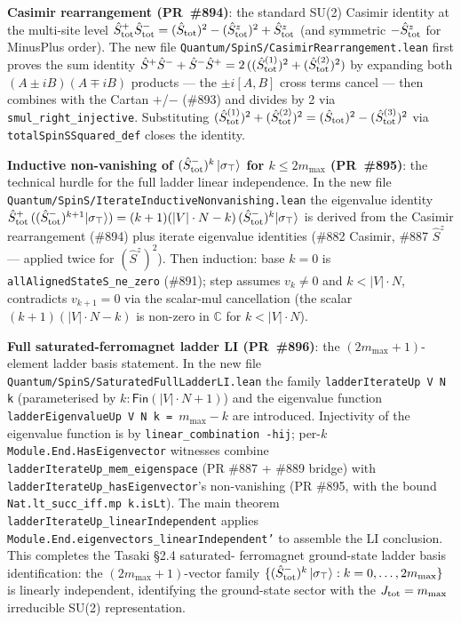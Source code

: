 \documentclass[a4paper,11pt]{article}
\begin{document}
\textbf{Casimir rearrangement (PR~\#894)}: the standard SU(2)
Casimir identity at the multi-site level
$\hat S^+_{\rm tot} \hat S^-_{\rm tot} =
 (\hat S_{\rm tot})^2 - (\hat S^z_{\rm tot})^2 + \hat S^z_{\rm tot}$
(and symmetric $-\hat S^z_{\rm tot}$ for MinusPlus order). The new
file \texttt{Quantum/SpinS/CasimirRearrangement.lean} first proves
the sum identity
$\hat S^+ \hat S^- + \hat S^- \hat S^+ = 2\,((\hat S^{(1)}_{\rm tot})
^2 + (\hat S^{(2)}_{\rm tot})^2)$ by expanding both
$(A \pm iB)(A \mp iB)$ products — the $\pm i [A, B]$ cross terms
cancel — then combines with the Cartan \(+\)/\(-\) (\#893) and divides by
2 via \texttt{smul\_right\_injective}. Substituting
$(\hat S^{(1)}_{\rm tot})^2 + (\hat S^{(2)}_{\rm tot})^2 =
 (\hat S_{\rm tot})^2 - (\hat S^{(3)}_{\rm tot})^2$
via \texttt{totalSpinSSquared\_def} closes the identity.

\textbf{Inductive non-vanishing of $(\hat S^-_{\rm tot})^k\,|\sigma_\top\rangle$
for $k\leq 2m_{\max}$ (PR~\#895)}: the technical hurdle for the
full ladder linear independence. In the new file
\texttt{Quantum/SpinS/IterateInductiveNonvanishing.lean} the
eigenvalue identity
$\hat S^+_{\rm tot}\,((\hat S^-_{\rm tot})^{k+1}|\sigma_\top\rangle)
 = (k+1)(|V|\cdot N - k)\,(\hat S^-_{\rm tot})^k|\sigma_\top\rangle$
is derived from the Casimir rearrangement (\#894) plus iterate
eigenvalue identities (\#882 Casimir, \#887 $\hat S^z$ — applied
twice for $(\hat S^z)^2$). Then induction: base $k=0$ is
\texttt{allAlignedStateS\_ne\_zero} (\#891); step assumes
$v_k \neq 0$ and $k < |V|\cdot N$, contradicts $v_{k+1} = 0$ via
the scalar-mul cancellation (the scalar $(k+1)(|V|\cdot N - k)$
is non-zero in $\mathbb{C}$ for $k < |V|\cdot N$).

\textbf{Full saturated-ferromagnet ladder LI (PR~\#896)}: the
$(2m_{\max} + 1)$-element ladder basis statement. In the new file
\texttt{Quantum/SpinS/SaturatedFullLadderLI.lean} the family
\texttt{ladderIterateUp V N k} (parameterised by $k:\textsf{Fin}
(|V|\cdot N+1)$) and the eigenvalue function
\texttt{ladderEigenvalueUp V N k = $m_{\max}-k$} are introduced.
Injectivity of the eigenvalue function is by
\texttt{linear\_combination -hij}; per-$k$
\texttt{Module.End.HasEigenvector} witnesses combine
\texttt{ladderIterateUp\_mem\_eigenspace} (PR \#887 + \#889 bridge)
with \texttt{ladderIterateUp\_hasEigenvector}'s non-vanishing
(PR \#895, with the bound \texttt{Nat.lt\_succ\_iff.mp k.isLt}).
The main theorem
\texttt{ladderIterateUp\_linearIndependent} applies
\texttt{Module.End.eigenvectors\_linearIndependent'} to assemble
the LI conclusion. This completes the Tasaki §2.4 saturated-
ferromagnet ground-state ladder basis identification: the
$(2m_{\max} + 1)$-vector family
$\{(\hat S^-_{\rm tot})^k\,|\sigma_\top\rangle :
 k = 0,\ldots,2m_{\max}\}$ is linearly independent, identifying
the ground-state sector with the $J_{\rm tot} = m_{\max}$
irreducible SU(2) representation.
\end{document}
